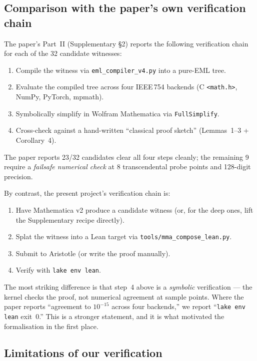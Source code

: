 \documentclass[11pt,a4paper]{article}
\theoremstyle{plain}
\theoremstyle{definition}
\begin{document}
\subsection{Comparison with the paper's own verification chain}

The paper's Part~II (Supplementary §2) reports the following
verification chain for each of the 32 candidate witnesses:

\begin{enumerate}[leftmargin=*,nosep]
\item Compile the witness via \texttt{eml\_compiler\_v4.py} into a
pure-EML tree.
\item Evaluate the compiled tree across four IEEE\,754 backends
(C \texttt{<math.h>}, NumPy, PyTorch, mpmath).
\item Symbolically simplify in Wolfram Mathematica via \texttt{FullSimplify}.
\item Cross-check against a hand-written ``classical proof sketch''
(Lemmas~1--3 + Corollary~4).
\end{enumerate}

The paper reports 23/32 candidates clear all four steps cleanly; the
remaining 9 require a \emph{failsafe numerical check} at 8 transcendental
probe points and 128-digit precision.

By contrast, the present project's verification chain is:

\begin{enumerate}[leftmargin=*,nosep]
\item Have Mathematica v2 produce a candidate witness (or, for the deep
ones, lift the Supplementary recipe directly).
\item Splat the witness into a Lean target via
\texttt{tools/mma\_compose\_lean.py}.
\item Submit to Aristotle (or write the proof manually).
\item Verify with \texttt{lake env lean}.
\end{enumerate}

The most striking difference is that step~4 above is a \emph{symbolic}
verification --- the kernel checks the proof, not numerical agreement
at sample points.  Where the paper reports ``agreement to $10^{-15}$
across four backends,'' we report ``\texttt{lake env lean} exit~0.''
This is a stronger statement, and it is what motivated the formalisation
in the first place.

\subsection{Limitations of our verification}
\end{document}
